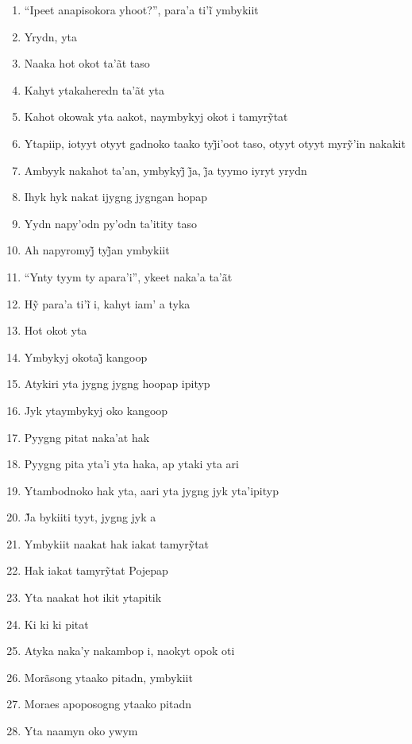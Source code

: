 \begin{enumerate}
 \item ``Ipeet anapisokora yhoot?'', para’a ti’ĩ ymbykiit
 \item Yrydn, yta
 \item Naaka hot okot ta'ãt taso
 \begin{center}\end{center}
 \item Kahyt ytakaheredn ta'ãt yta
 \item Kahot okowak yta aakot, naymbykyj okot i tamyrỹtat
 \item Ytapiip, iotyyt otyyt gadnoko taako tyj̃i’oot taso, otyyt otyyt myrỹ’in nakakit
 \item Ambyyk nakahot ta’an, ymbykyj̃ j̃a, j̃a tyymo iyryt yrydn
 \item Ihyk hyk nakat ijygng jygngan hopap
 \item Yydn napy'odn py'odn ta'itity taso
 \item Ah napyromyj̃ tyj̃an ymbykiit
 \item ``Ynty tyym ty apara'i'', ykeet naka'a ta'ãt
 \item Hỹ para’a ti’ĩ i, kahyt iam’ a tyka
 \item Hot okot yta
 \item Ymbykyj okotaj̃ kangoop
 \item Atykiri yta jygng jygng hoopap ipityp
 \item Jyk ytaymbykyj oko kangoop
 \item Pyygng pitat naka'at hak
 \begin{center}\end{center}
 \item Pyygng pita yta'i yta haka, ap ytaki yta ari
 \item Ytambodnoko hak yta, aari yta jygng jyk yta'ipityp
 \item J̃a bykiiti tyyt, jygng jyk a
 \item Ymbykiit naakat hak iakat tamyrỹtat
 \item Hak iakat tamyrỹtat Pojepap
 \item Yta naakat hot ikit ytapitik
 \item Ki ki ki pitat
 \begin{center}\end{center}
 \item Atyka naka'y nakambop i, naokyt opok oti
 \item Morãsong ytaako pitadn, ymbykiit
 \item Moraes apoposogng ytaako pitadn
 \item Yta naamyn oko ywym

\end{enumerate}
